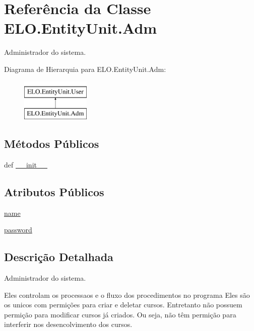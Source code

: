 \hypertarget{classELO_1_1EntityUnit_1_1Adm}{\section{Referência da Classe E\-L\-O.\-Entity\-Unit.\-Adm}
\label{classELO_1_1EntityUnit_1_1Adm}
}


Administrador do sistema.  


Diagrama de Hierarquia para E\-L\-O.\-Entity\-Unit.\-Adm\-:\begin{figure}[H]
\begin{center}
\leavevmode
\includegraphics[height=2.000000cm]{d3/d3a/classELO_1_1EntityUnit_1_1Adm}
\end{center}
\end{figure}
\subsection*{Métodos Públicos}
\begin{DoxyCompactItemize}
\item 
def \hyperlink{classELO_1_1EntityUnit_1_1Adm_a01e2f40a6af7208831e2b35bf155dc9e}{\-\_\-\-\_\-init\-\_\-\-\_\-}
\end{DoxyCompactItemize}
\subsection*{Atributos Públicos}
\begin{DoxyCompactItemize}
\item 
\hyperlink{classELO_1_1EntityUnit_1_1Adm_a12f7aaf17dc6e036186e7757244cd12a}{name}
\item 
\hyperlink{classELO_1_1EntityUnit_1_1Adm_aed97c3f4efa1320ef99b3794b51f8e5e}{password}
\end{DoxyCompactItemize}


\subsection{Descrição Detalhada}
Administrador do sistema. 

Eles controlam os processaos e o fluxo dos procedimentos no programa Eles são os unicos com permições para criar e deletar cursos. Entretanto não possuem permição para modificar cursos já criados. Ou seja, não têm permição para interferir nos desencolvimento dos cursos. 

